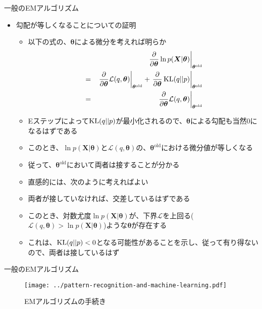 \documentclass[dvipdfmx,notheorems,t]{beamer}
\begin{document}
\begin{frame}{一般のEMアルゴリズム}

\begin{itemize}
	\item 勾配が等しくなることについての証明
	\begin{itemize}
		\item 以下の式の、$\bm{\theta}$による微分を考えれば明らか
		\begin{eqnarray}
			&& \left. \frac{\partial}{\partial \bm{\theta}} \ln p(\bm{X} | \bm{\theta}) \right|_{\bm{\theta}^\mathrm{old}} \nonumber \\
			&=& \left. \frac{\partial}{\partial \bm{\theta}} \mathcal{L}(q, \bm{\theta}) \right|_{\bm{\theta}^\mathrm{old}} + \left. \frac{\partial}{\partial \bm{\theta}} \operatorname{KL} (q || p) \right|_{\bm{\theta}^\mathrm{old}} \nonumber \\
			&=& \left. \frac{\partial}{\partial \bm{\theta}} \mathcal{L}(q, \bm{\theta}) \right|_{\bm{\theta}^\mathrm{old}}
		\end{eqnarray}
		
		\item Eステップによって$\operatorname{KL} (q || p)$が最小化されるので、$\bm{\theta}$による勾配も当然$0$になるはずである
		\item このとき、$\ln p(\bm{X} | \bm{\theta})$と$\mathcal{L}(q, \bm{\theta})$の、$\bm{\theta}^\mathrm{old}$における微分値が等しくなる
		\item 従って、$\bm{\theta}^\mathrm{old}$において\alert{両者は接する}ことが分かる
		\newline
		\item 直感的には、次のように考えればよい
		\item 両者が接していなければ、交差しているはずである
		\item このとき、対数尤度$\ln p(\bm{X} | \bm{\theta})$が、下界$\mathcal{L}$を上回る($\mathcal{L}(q, \bm{\theta}) > \ln p(\bm{X} | \bm{\theta})$)ような$\bm{\theta}$が存在する
		\newline
		\item これは、$\operatorname{KL} (q || p) < 0$となる可能性があることを示し、従って有り得ないので、両者は接しているはず
	\end{itemize}
\end{itemize}

\end{frame}

\begin{frame}{一般のEMアルゴリズム}

\begin{figure}[h]
	\centering
	\texttt{[image: ../pattern-recognition-and-machine-learning.pdf]}
	\caption{EMアルゴリズムの手続き}
	\label{fig:em-algorithm-visualization}
\end{figure}

\end{frame}
\end{document}
